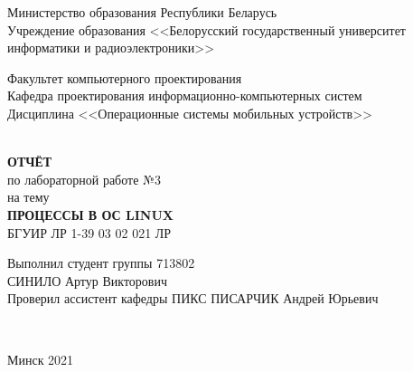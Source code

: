 
\begin{titlepage}
  \begin{center}
    Министерство образования Республики Беларусь\\
    Учреждение образования <<Белорусский государственный университет информатики и радиоэлектроники>>\\[2em]

    \begin{minipage}{\textwidth}
      \begin{flushleft}
		  Факультет компьютерного проектирования\\[1em]

		  Кафедра проектирования информационно-компьютерных систем\\[1em]

          Дисциплина <<Операционные системы мобильных устройств>>
      \end{flushleft}
    \end{minipage}\\[5em]

	\textbf{\MakeTextUppercase{Отчёт}}\\
    {по лабораторной работе №3}\\
	{на тему}\\[1em]
	\textbf{\MakeTextUppercase{ПРОЦЕССЫ В ОС LINUX}}\\[1em]

	{БГУИР ЛР 1-39 03 02 021 ЛР}\\[5em]

    \begin{flushright}
      \begin{minipage}{0.5\textwidth}
        \begin{flushleft}
          Выполнил студент группы 713802\\
		  \MakeTextUppercase{Синило} Артур Викторович\\[2em]

          Проверил ассистент кафедры ПИКС
		  \MakeTextUppercase{Писарчик} Андрей Юрьевич
        \end{flushleft}
      \end{minipage}\\[2.2em]
    \end{flushright}

        \vfill
    {\normalsize Минск 2021}
  \end{center}
\end{titlepage}
